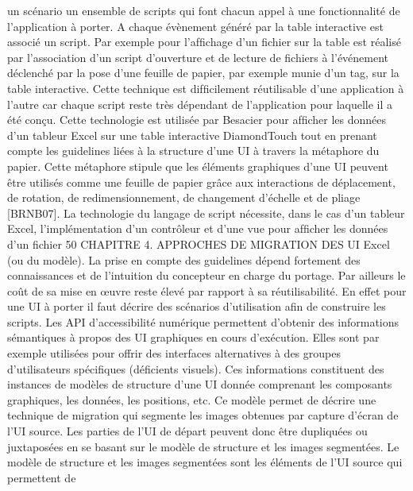 \documentclass{article}
\begin{document}
un sc\'{e}nario un ensemble de scripts qui font chacun appel \`{a} une fonctionnalit\'{e} de l’application \`{a} porter.
A chaque \'{e}v\`{e}nement g\'{e}n\'{e}r\'{e} par la table interactive est associ\'{e} un script. Par exemple pour l’afﬁchage
d’un ﬁchier sur la table est r\'{e}alis\'{e} par l’association d’un script d’ouverture et de lecture de ﬁchiers \`{a}
l’\'{e}v\'{e}nement d\'{e}clench\'{e} par la pose d’une feuille de papier, par exemple munie d’un tag, sur la table
interactive. Cette technique est difﬁcilement r\'{e}utilisable d’une application \`{a} l’autre car chaque script
reste tr\`{e}s d\'{e}pendant de l’application pour laquelle il a \'{e}t\'{e} con\c{c}u. Cette technologie est utilis\'{e}e par
Besacier pour afﬁcher les donn\'{e}es d’un tableur Excel sur une table interactive DiamondTouch tout
en prenant compte les guidelines li\'{e}es \`{a} la structure d’une UI \`{a} travers la m\'{e}taphore du papier. Cette
m\'{e}taphore stipule que les \'{e}l\'{e}ments graphiques d’une UI peuvent \^{e}tre utilis\'{e}s comme une feuille de
papier gr\^{a}ce aux interactions de d\'{e}placement, de rotation, de redimensionnement, de changement
d’\'{e}chelle et de pliage [BRNB07]. La technologie du langage de script n\'{e}cessite, dans le cas d’un
tableur Excel, l’impl\'{e}mentation d’un contr\^{o}leur et d’une vue pour afﬁcher les donn\'{e}es d’un ﬁchier
50
CHAPITRE 4. APPROCHES DE MIGRATION DES UI
Excel (ou du mod\`{e}le). La prise en compte des guidelines d\'{e}pend fortement des connaissances et de
l’intuition du concepteur en charge du portage. Par ailleurs le co\^{u}t de sa mise en œuvre reste \'{e}lev\'{e} par
rapport \`{a} sa r\'{e}utilisabilit\'{e}. En effet pour une UI \`{a} porter il faut d\'{e}crire des sc\'{e}narios d’utilisation aﬁn
de construire les scripts.
Les API d’accessibilit\'{e} num\'{e}rique
permettent d’obtenir des informations s\'{e}mantiques \`{a} propos
des UI graphiques en cours d’ex\'{e}cution. Elles sont par exemple utilis\'{e}es pour offrir des interfaces
alternatives \`{a} des groupes d’utilisateurs sp\'{e}ciﬁques (d\'{e}ﬁcients visuels). Ces informations constituent
des instances de mod\`{e}les de structure d’une UI donn\'{e}e comprenant les composants graphiques, les
donn\'{e}es, les positions, etc. Ce mod\`{e}le permet de d\'{e}crire une technique de migration qui segmente
les images obtenues par capture d’\'{e}cran de l’UI source. Les parties de l’UI de d\'{e}part peuvent donc
\^{e}tre dupliqu\'{e}es ou juxtapos\'{e}es en se basant sur le mod\`{e}le de structure et les images segment\'{e}es. Le
mod\`{e}le de structure et les images segment\'{e}es sont les \'{e}l\'{e}ments de l’UI source qui permettent de
\end{document}
